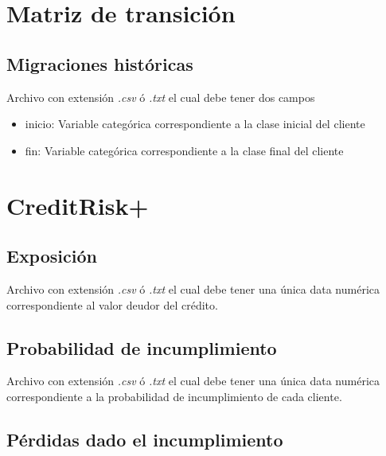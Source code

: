 \documentclass[
  12pt,
]{krantz}
\theoremstyle{definition}
\theoremstyle{definition}
\theoremstyle{definition}
\theoremstyle{remark}
\begin{document}
\hypertarget{matriz-de-transicion-4}{%
\section{Matriz de transición}\label{matriz-de-transicion-4}}

\hypertarget{migraciones-historicas}{%
\subsection{Migraciones históricas}\label{migraciones-historicas}}

Archivo con extensión \emph{.csv} ó \emph{.txt} el cual debe tener dos campos

\begin{itemize}
\item
  inicio: Variable categórica correspondiente a la clase inicial del cliente
\item
  fin: Variable categórica correspondiente a la clase final del cliente
\end{itemize}

\hypertarget{creditrisk-3}{%
\section{CreditRisk+}\label{creditrisk-3}}

\hypertarget{exposicion-2}{%
\subsection{Exposición}\label{exposicion-2}}

Archivo con extensión \emph{.csv} ó \emph{.txt} el cual debe tener una única data numérica correspondiente al valor deudor del crédito.

\hypertarget{probabilidad-de-incumplimiento-1}{%
\subsection{Probabilidad de incumplimiento}\label{probabilidad-de-incumplimiento-1}}

Archivo con extensión \emph{.csv} ó \emph{.txt} el cual debe tener una única data numérica correspondiente a la probabilidad de incumplimiento de cada cliente.

\hypertarget{perdidas-dado-el-incumplimiento-2}{%
\subsection{Pérdidas dado el incumplimiento}\label{perdidas-dado-el-incumplimiento-2}}
\end{document}
